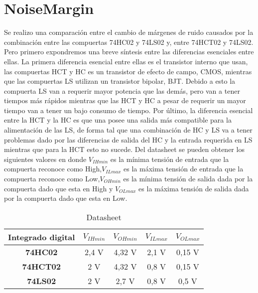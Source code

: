 %

%
\chapter{NoiseMargin}
Se realizo una comparación entre el cambio de márgenes de ruido causados por la combinación entre las compuertas 74HC02 y 74LS02 y, entre 74HCT02 y 74LS02. Pero primero expondremos una breve síntesis entre las diferencias esenciales entre ellas.
La primera diferencia esencial entre ellas es el transistor interno que usan, las compuertas HCT y HC es un transistor de efecto de campo, CMOS, mientras que las compuertas LS utilizan un transistor bipolar, BJT. Debido a esto la compuerta LS van a requerir mayor potencia que las demás, pero van a tener tiempos más rápidos mientras que las HCT y HC a pesar de requerir un mayor tiempo van a tener un bajo consumo de tiempo. Por último, la diferencia esencial entre la HCT y la HC es que una posee una salida más compatible para la alimentación de las LS, de forma tal que una combinación de HC y LS va a tener problemas dado por las diferencias de salida del HC y la entrada requerida en LS mientras que para la HCT esto no sucede.
Del datasheet se pueden obtener los siguientes valores en donde $V_{IHmin}$ es la mínima tensión de entrada que la compuerta reconoce como High,$V_{ILmax}$ es la máxima tensión de entrada que la compuerta reconoce como Low,$V_{OHmin}$ es la mínima tensión de salida dada por la compuerta dado que esta en High y $V_{OLmax}$ es la máxima tensión de salida dada por la compuerta dado que esta en Low.
\begin{center}
	\begin{table}[h!]
		\begin{center}
		\caption{Datasheet}
			\begin{tabular}{|c|c|c|c|c|}
				\hline
				\textbf{Integrado digital} & \textbf{$V_{IHmin}$} & \textbf{$V_{OHmin}$} & \textbf{$V_{ILmax}$}& \textbf{$V_{OLmax}$}\\
				\hline
				\textbf{74HC02} & 2,4 V & 4,32 V & 2,1 V & 0,15 V\\
				\hline
				\textbf{74HCT02} & 2 V & 4,32 V & 0,8 V & 0,15 V\\	
				\hline
				\textbf{74LS02} & 2 V & 2,7 V & 0,8 V & 0,5 V\\
				\hline
			\end{tabular}
		\end{center}
	\end{table}
\end{center}
